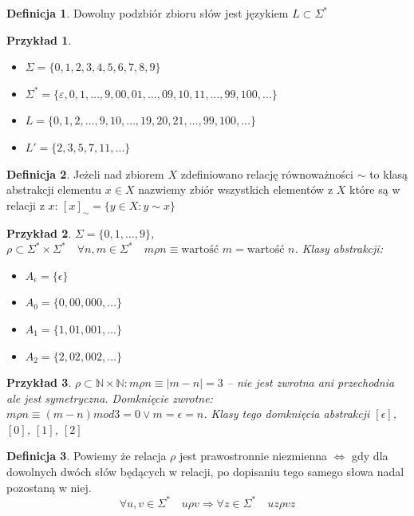 \documentclass[12pt,a4paper]{article}
\newtheorem{przyklad}{Przykład}
\theoremstyle{definition}
\newtheorem{df}{Definicja}
\begin{document}
	\begin{df}
		Dowolny podzbiór zbioru słów jest językiem $L \subset \Sigma^*$
	\end{df}

	\begin{przyklad}~\\
		\begin{itemize}
			\item $\Sigma = \{0, 1, 2, 3, 4, 5, 6, 7, 8, 9\}$
			\item $\Sigma^* = \{\varepsilon, 0, 1, \dots, 9, 00, 01, \dots, 09, 10, 11, \dots, 99, 100, \dots\}$
			\item $L = \{0, 1, 2, \dots, 9, 10, \dots, 19, 20, 21, \dots, 99, 100, \dots \}$
			\item $L' = \{2, 3, 5, 7, 11, \dots \}$
		\end{itemize}
	\end{przyklad}

	\begin{df}
		Jeżeli nad zbiorem $X$ zdefiniowano relację równoważności $\sim$ to klasą abstrakcji elementu $x\in X$ nazwiemy zbiór wszystkich elementów 
		z $X$ które są w relacji z $x$: $[x]_\sim = \{y\in X: y\sim x\}$
	\end{df}		
	
	\begin{przyklad}
		$\Sigma = \{0, 1, \dots, 9\}$, $\rho \subset \Sigma^* \times \Sigma^* \quad \forall n,m\in \Sigma^* \quad m\rho n \equiv
		 \text{wartość } m = \text{wartość } n$. Klasy abstrakcji: \\
		\begin{itemize}
			\item $A_\epsilon = \{\epsilon\}$
			\item $A_0 = \{0, 00, 000, \dots\}$
			\item $A_1 = \{1, 01, 001, \dots\}$
			\item $A_2 = \{2, 02, 002, \dots\}$
		\end{itemize}
	\end{przyklad}		
	
	\begin{przyklad}
		$\rho \subset \mathbb{N} \times \mathbb{N}:  m\rho n \equiv |m-n| = 3$ -- nie jest zwrotna ani przechodnia ale jest symetryczna.
		Domknięcie zwrotne: $m\rho n \equiv (m-n) mod 3 = 0 \vee m = \epsilon = n$. Klasy tego domknięcia abstrakcji $[\epsilon]$, $[0]$, $[1]$, $[2]$
	\end{przyklad}
	
	\begin{df}
		Powiemy że relacja $\rho$ jest prawostronnie niezmienna $\Leftrightarrow$ gdy dla dowolnych dwóch słów będących w relacji, po dopisaniu
		tego samego słowa nadal pozostaną w niej. 
		$$ \forall u, v \in \Sigma^* \quad u\rho v \Rightarrow \forall z\in\Sigma^* \quad uz \rho vz $$
	\end{df}
	
\end{document}
